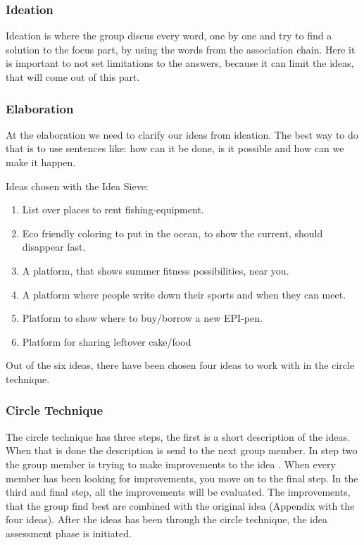 \subsubsection{Ideation}
Ideation is where the group discus every word, one by one and try to find a solution to the focus part, by using the words from the association chain. Here it is important to not set limitations to the answers, because it can limit the ideas, that will come out of this part.

\subsubsection{Elaboration}
At the elaboration we need to clarify our ideas from ideation. The best way to do that is to use sentences like: how can it be done, is it possible and how can we make it happen.

Ideas chosen with the Idea Sieve:
\begin{enumerate}
	\item List over places to rent fishing-equipment. 
	\item Eco friendly coloring to put in the ocean, to show the current, should disappear fast.
	\item A platform, that shows summer fitness possibilities, near you.
	\item A platform where people write down their sports and when they can meet.
	\item Platform to show where to buy/borrow a new EPI-pen.
	\item Platform for sharing leftover cake/food      
\end{enumerate}

Out of the six ideas,  there have been chosen four ideas to work with in the circle technique.

\subsubsection{Circle Technique}
The circle technique has three steps, the first is a short description of the ideas. When that is done the description is send to the next group member. In step two the group member is trying to make improvements to the idea . When every member has been looking for improvements, you move on to the final step. In the third and final step, all the improvements will be evaluated. The improvements, that the group find best are combined with the original idea (Appendix with the four ideas). After the ideas has been through the circle technique, the idea assessment phase is initiated.

